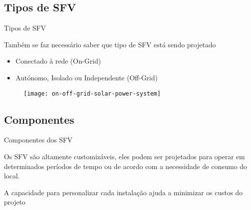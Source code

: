 \subsection{Tipos de SFV}

\begin{frame}{Tipos de SFV}

Também se faz necessário saber que tipo de SFV está sendo projetado

\vspace{.5cm}

\begin{itemize}
\item Conectado à rede (On-Grid)
\item Autónomo, Isolado ou Independente (Off-Grid)
\end{itemize}

\begin{figure}[H]
	\texttt{[image: on-off-grid-solar-power-system]}
\end{figure} 

\end{frame}

\subsection{Componentes}

\begin{frame}{Componentes dos SFV}

Os SFV são altamente customizáveis, eles podem ser projetados para operar em determinados períodos de tempo ou de acordo com a necessidade de consumo do local.

\begin{center}
\end{center}
 
\begin{exampleblock}{}
	\begin{center}
	A capacidade para personalizar cada instalação ajuda a minimizar os custos do projeto 
	\end{center} 
\end{exampleblock}
 
 
\end{frame}


